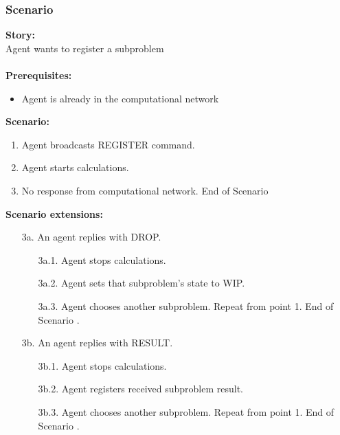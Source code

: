 \documentclass{article}
\begin{document}
\subsubsection{Scenario }
\noindent\textbf{Story:} \\
Agent wants to register a subproblem \\\\
\textbf{Prerequisites:}
\begin{itemize}
    \item Agent is already in the computational network
\end{itemize}
\textbf{Scenario:}
\begin{enumerate}
    \item Agent broadcasts REGISTER command.
    \item Agent starts calculations.
    \item No response from computational network. End of Scenario 
\end{enumerate}
\textbf{Scenario extensions:}
\begin{itemize}
    \item[3a.] An agent replies with DROP.
    \begin{itemize} 
    \item[3a.1.] Agent stops calculations.
    \item[3a.2.] Agent sets that subproblem's state to WIP.
    \item[3a.3.] Agent chooses another subproblem. Repeat from point 1. End of Scenario .  
    \end{itemize}
    \item[3b.] An agent replies with RESULT. 
    \begin{itemize} 
    \item[3b.1.] Agent stops calculations.
    \item[3b.2.] Agent registers received subproblem result. 
    \item[3b.3.] Agent chooses another subproblem. Repeat from point 1. End of Scenario .  
    \end{itemize}
\end{itemize}
\end{document}

